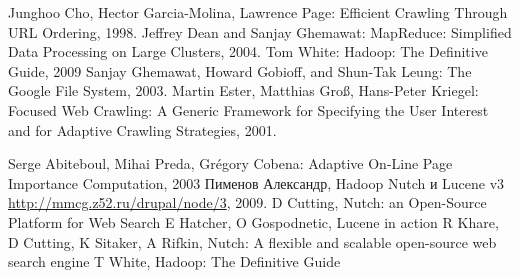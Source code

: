 \documentclass[a4paper,10pt]{report}
\begin{document}
\begin{thebibliography}{9}
 Junghoo Cho, Hector Garcia-Molina, Lawrence Page: Efficient Crawling Through URL Ordering, 1998.
 Jeffrey Dean and Sanjay Ghemawat: MapReduce: Simplified Data Processing on Large Clusters, 2004.
 Tom White: Hadoop: The Definitive Guide, 2009
 Sanjay Ghemawat, Howard Gobioff, and Shun-Tak Leung: The Google File System, 2003.
 Martin Ester, Matthias Groß, Hans-Peter Kriegel: Focused Web Crawling: A Generic Framework for Specifying the User Interest and for Adaptive Crawling Strategies, 2001.

 Serge Abiteboul, Mihai Preda, Grégory Cobena: Adaptive On-Line Page Importance Computation, 2003
 Пименов Александр, Hadoop Nutch и Lucene v3 \href{http://mmcg.z52.ru/drupal/node/3}{http://mmcg.z52.ru/drupal/node/3}, 2009.
 D Cutting, Nutch: an Open-Source Platform for Web Search
 E Hatcher, O Gospodnetic, Lucene in action
 R Khare, D Cutting, K Sitaker, A Rifkin, Nutch: A flexible and scalable open-source web search engine
 T White, Hadoop: The Definitive Guide

\end{thebibliography}
\end{document}
